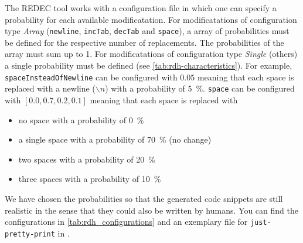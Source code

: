 \documentclass[%
class=scrreprt,
chapterprefix=false,%
open=right,%
twoside=false,%
paper=a4,%
logofile={Logo\_zentral\_farbig\_EN.png},%
thesistype=master,%
UKenglish,%
]{se2thesis}
\theoremstyle{definition}
\newcommand{\mod}{modificatation\xspace}
\newcommand{\mods}{modificatations\xspace}
\newcommand{\RDH}{Readability Decreaser\xspace}
\newcommand{\rdh}{REDEC\xspace}
\newcommand{\RDHa}{\RDH (\rdh)\xspace} %
\newcommand{\none}{just-pretty-print\xspace} %
\newcommand{\nonet}{\texttt{\none}\xspace} %
\begin{document}
	
	The \rdh tool works with a configuration file in which one can specify a probability for each available \mod.
	For \mods of configuration type \textit{Array} (\texttt{newline}, \texttt{incTab}, \texttt{decTab} and \texttt{space}), a array of probabilities must be defined for the respective number of replacements. The probabilities of the array must sum up to 1.
	For \mods of configuration type \textit{Single} (others) a single probability must be defined (see \autoref{tab:rdh-characteristics}).
	For example, \texttt{spaceInsteadOfNewline} can be configured with $0.05$ meaning that each space is replaced with a newline ($\backslash n$) with a probability of 5~\%.
	\texttt{space} can be configured with $[0.0, 0.7, 0.2, 0.1]$ meaning that each space is replaced with
	\begin{itemize}
		\item no space with a probability of 0~\%
		\item a single space with a probability of 70~\% (no change)
		\item two spaces with a probability of 20~\%
		\item three spaces with a probability of 10~\% 
	\end{itemize}
		
	We have chosen the probabilities so that the generated code snippets are still realistic in the sense that they could also be written by humans. You can find the configurations in \autoref{tab:rdh_configurations} and an exemplary file for \nonet in .
	
\end{document}
